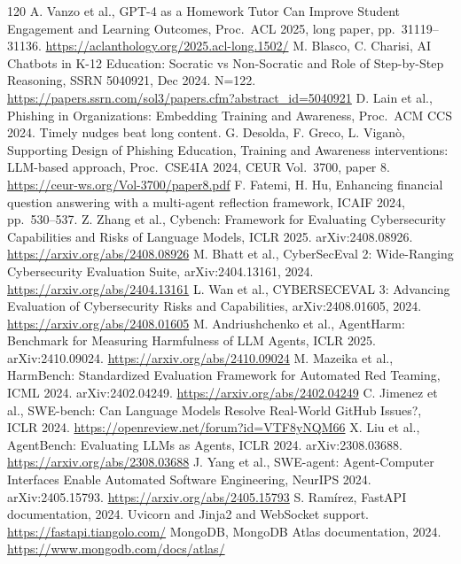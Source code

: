 \documentclass[11pt,a4paper]{article}
\begin{document}
\begin{thebibliography}{120}
 A. Vanzo et al., GPT-4 as a Homework Tutor Can Improve Student Engagement and Learning Outcomes, Proc.\ ACL 2025, long paper, pp.~31119--31136. \url{https://aclanthology.org/2025.acl-long.1502/}
 M. Blasco, C. Charisi, AI Chatbots in K-12 Education: Socratic vs Non-Socratic and Role of Step-by-Step Reasoning, SSRN 5040921, Dec 2024. N=122. \url{https://papers.ssrn.com/sol3/papers.cfm?abstract_id=5040921}
 D. Lain et al., Phishing in Organizations: Embedding Training and Awareness, Proc.\ ACM CCS 2024. Timely nudges beat long content.
 G. Desolda, F. Greco, L. Vigan\`o, Supporting Design of Phishing Education, Training and Awareness interventions: LLM-based approach, Proc.\ CSE4IA 2024, CEUR Vol.~3700, paper 8. \url{https://ceur-ws.org/Vol-3700/paper8.pdf}
 F. Fatemi, H. Hu, Enhancing financial question answering with a multi-agent reflection framework, ICAIF 2024, pp.~530--537.
 Z. Zhang et al., Cybench: Framework for Evaluating Cybersecurity Capabilities and Risks of Language Models, ICLR 2025. arXiv:2408.08926. \url{https://arxiv.org/abs/2408.08926}
 M. Bhatt et al., CyberSecEval 2: Wide-Ranging Cybersecurity Evaluation Suite, arXiv:2404.13161, 2024. \url{https://arxiv.org/abs/2404.13161}
 L. Wan et al., CYBERSECEVAL 3: Advancing Evaluation of Cybersecurity Risks and Capabilities, arXiv:2408.01605, 2024. \url{https://arxiv.org/abs/2408.01605}
 M. Andriushchenko et al., AgentHarm: Benchmark for Measuring Harmfulness of LLM Agents, ICLR 2025. arXiv:2410.09024. \url{https://arxiv.org/abs/2410.09024}
 M. Mazeika et al., HarmBench: Standardized Evaluation Framework for Automated Red Teaming, ICML 2024. arXiv:2402.04249. \url{https://arxiv.org/abs/2402.04249}
 C. Jimenez et al., SWE-bench: Can Language Models Resolve Real-World GitHub Issues?, ICLR 2024. \url{https://openreview.net/forum?id=VTF8yNQM66}
 X. Liu et al., AgentBench: Evaluating LLMs as Agents, ICLR 2024. arXiv:2308.03688. \url{https://arxiv.org/abs/2308.03688}
 J. Yang et al., SWE-agent: Agent-Computer Interfaces Enable Automated Software Engineering, NeurIPS 2024. arXiv:2405.15793. \url{https://arxiv.org/abs/2405.15793}
 S. Ram\'irez, FastAPI documentation, 2024. Uvicorn and Jinja2 and WebSocket support. \url{https://fastapi.tiangolo.com/}
 MongoDB, MongoDB Atlas documentation, 2024. \url{https://www.mongodb.com/docs/atlas/}

\end{thebibliography}
\end{document}
